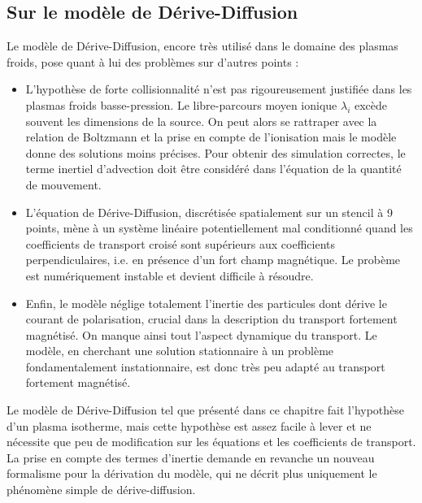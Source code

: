 \begin{refsection}
\subsection{Sur le modèle de Dérive-Diffusion}

Le modèle de Dérive-Diffusion, encore très utilisé dans le domaine des plasmas
froids, pose quant à lui des problèmes sur d'autres points :

\begin{itemize}
  \item L'hypothèse de forte collisionnalité n'est pas rigoureusement justifiée
  dans les plasmas froids basse-pression. Le libre-parcours moyen ionique
  $\lambda_i$ excède souvent les dimensions de la source. On peut alors se
  rattraper avec la relation de Boltzmann et la prise en compte de l'ionisation
  mais le modèle donne des solutions moins précises. Pour obtenir des
  simulation correctes, le terme inertiel d'advection doit être considéré dans
  l'équation de la quantité de mouvement.
  \item L'équation de Dérive-Diffusion, discrétisée spatialement sur un
	stencil à 9 points, mène à un système linéaire potentiellement mal conditionné
	quand les coefficients de transport croisé sont supérieurs aux
	coefficients perpendiculaires, i.e. en présence d'un fort champ magnétique. Le
	probème est numériquement instable et devient difficile à résoudre. 
	\item Enfin, le modèle néglige totalement l'inertie des particules dont dérive
	le courant de polarisation, crucial dans la description du transport fortement
	magnétisé. On manque ainsi tout l'aspect dynamique du transport. Le
	modèle, en cherchant une solution stationnaire à un problème fondamentalement
	instationnaire, est donc très peu adapté au transport fortement magnétisé.
\end{itemize}

Le modèle de Dérive-Diffusion tel que présenté dans ce chapitre fait
l'hypothèse d'un plasma isotherme, mais cette hypothèse est assez facile à
lever et ne nécessite que peu de modification sur les équations et les
coefficients de transport. La prise en compte des termes d'inertie demande en
revanche un nouveau formalisme pour la dérivation du modèle, qui ne décrit plus
uniquement le phénomène simple de dérive-diffusion.

%
%
\end{refsection}

